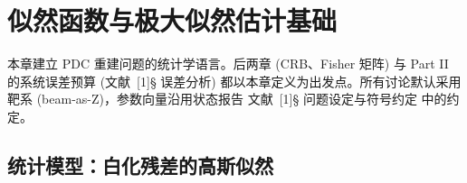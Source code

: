 %
%
%

\providecommand{\StatusReport}{文献~[1]}

\section{似然函数与极大似然估计基础}
\label{sec:partIa:likelihood:basics}

本章建立 PDC 重建问题的统计学语言。后两章 (CRB、Fisher 矩阵) 与 Part II 的系统误差预算 (\StatusReport § 误差分析) 都以本章定义为出发点。所有讨论默认采用靶系 (beam-as-Z)，参数向量沿用状态报告 \StatusReport § 问题设定与符号约定 中的约定。

\subsection{统计模型：白化残差的高斯似然}
\label{sec:partIa:lik:model}

